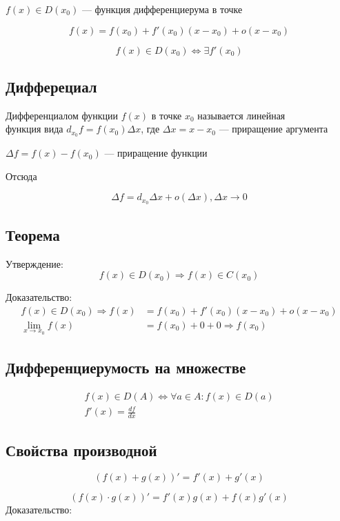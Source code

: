 \documentclass{article}
\begin{document}
$f(x) \in D(x_0)$ --- функция дифференциерума в точке

\[
	f(x) = f(x_0) + f'(x_0)(x - x_0) + o(x - x_0)
\]

\[
	f(x) \in D(x_0) \Leftrightarrow \exists f'(x_0)
\]

\subsection{Дифферециал}

Дифференциалом функции $f(x)$ в точке $x_0$ называется линейная \\
функция вида $d_{x_0} f = f(x_0) \Delta x$, где $\Delta x = x - x_0$ --- приращение аргумента

$\Delta f = f(x) - f(x_0)$ --- приращение функции

Отсюда

\[
	\Delta f = d_{x_0} \Delta x + o(\Delta x), \Delta x \to 0
\]

\subsection{Теорема}

Утверждение:
\[
	f(x) \in D(x_0) \Rightarrow f(x) \in C(x_0)
\]

Доказательство:
\begin{align*}
	f(x) \in D(x_0) \Rightarrow f(x) &= f(x_0) + f'(x_0)(x - x_0) + o(x - x_0) \\
	\lim_{x \to x_0} f(x) &= f(x_0) + 0 + 0 \Rightarrow f(x_0)
\end{align*}

\subsection{Дифференциерумость на множестве}

\begin{gather*}
	f(x) \in D(A) \Leftrightarrow \forall a \in A : f(x) \in D(a) \\
	f'(x) = \frac{df}{dx}
\end{gather*}

\subsection{Свойства производной}

\[
	(f(x) + g(x))' = f'(x) + g'(x)
\]

\[
	(f(x) \cdot g(x))' = f'(x)g(x) + f(x)g'(x)
\]
Доказательство:
\end{document}
